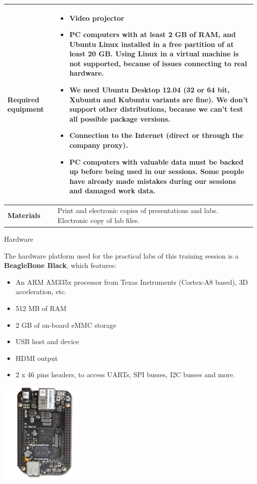 \documentclass[a4paper,12pt,obeyspaces,spaces,hyphens]{article}
\begin{document}
{\begin{tabularx}{\textwidth}{|g|h|}
    {\bf Required equipment} &
    \begin{itemize}
    \item Video projector
    \item PC computers with at least 2 GB of RAM, and Ubuntu Linux
    installed in a {\bf free partition of at least 20 GB. Using Linux
      in a virtual machine is not supported}, because of issues
    connecting to real hardware.
    \item We need Ubuntu Desktop 12.04 (32 or 64 bit, Xubuntu and
    Kubuntu variants are fine). We don't support other
    distributions, because we can't test all possible package versions.
    \item {\bf Connection to the Internet} (direct or through the
    company proxy).
    \item {\bf PC computers with valuable data must be backed up}
    before being used in our sessions.  Some people have already made
    mistakes during our sessions and damaged work data.
    \end{itemize} \\
    \hline

    {\bf Materials} & Print and electronic copies of presentations and
    labs.
    \newline Electronic copy of lab files.\\
    \hline

\end{tabularx}}
\normalsize

\feagendatwocolumn
{Hardware}
{
  The hardware platform used for the practical labs of this training
  session is a {\bf BeagleBone Black}, which features:

  \begin{itemize}
  \item An ARM AM335x processor from Texas Instruments (Cortex-A8
    based), 3D acceleration, etc.
  \item 512 MB of RAM
  \item 2 GB of on-board eMMC storage
  \item USB host and device
  \item HDMI output
  \item 2 x 46 pins headers, to access UARTs, SPI busses, I2C busses
    and more.
  \end{itemize}
}
{}
{
  \begin{center}
    \includegraphics[height=5cm]{agenda/beagleboneblack.png}
  \end{center}
}
\end{document}
